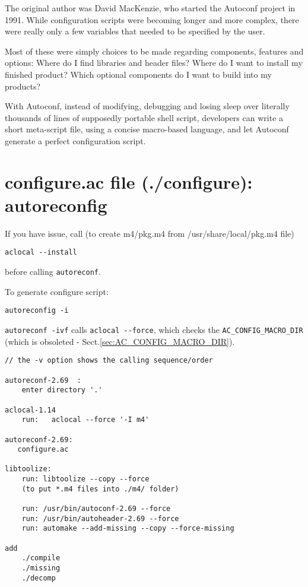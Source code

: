  The original author was David MacKenzie, who started the Autoconf project in
1991. While configuration scripts were becoming longer and more complex, there
were really only a few variables that needed to be specified by the user.  

Most of these were simply choices to be made regarding components, features and
options: Where do I find libraries and header files? Where do I want to install
my finished product? Which optional components do I want to build into my products? 

With Autoconf, instead of modifying, debugging and losing sleep over literally
thousands of lines of supposedly portable shell script, developers can write a
short meta-script file, using a concise macro-based language, and let Autoconf
generate a perfect configuration script.  



\section{configure.ac file (./configure): autoreconfig}
\label{sec:configure.ac}
\label{sec:autoreconf-tool}

If you have issue, call (to create m4/pkg.m4 from /usr/share/local/pkg.m4 file)
\begin{verbatim}
aclocal --install
\end{verbatim}
before calling \verb!autoreconf!.

To generate configure script:
\begin{verbatim}
autoreconfig -i
\end{verbatim}

\verb!autoreconf -ivf! calls \verb!aclocal --force!, which checks the
\verb!AC_CONFIG_MACRO_DIR! (which is obsoleted -
Sect.\ref{sec:AC_CONFIG_MACRO_DIR}).
\begin{verbatim}
// the -v option shows the calling sequence/order

autoreconf-2.69  : 
    enter directory '.'

aclocal-1.14
    run:   aclocal --force '-I m4'

autoreconf-2.69: 
   configure.ac 
       
libtoolize:
    run: libtoolize --copy --force
    (to put *.m4 files into ./m4/ folder)
    
    run: /usr/bin/autoconf-2.69 --force
    run: /usr/bin/autoheader-2.69 --force
    run: automake --add-missing --copy --force-missing

add    
    ./compile
    ./missing
    ./decomp
\end{verbatim}



